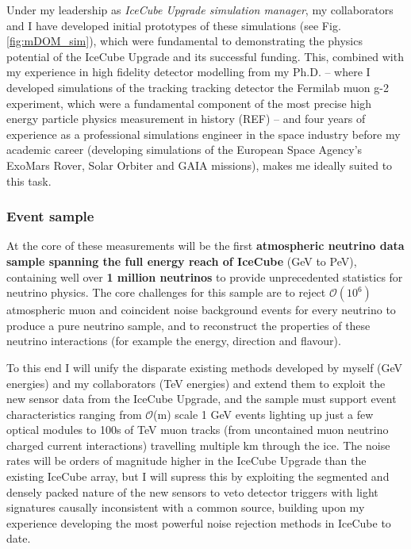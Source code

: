 \documentclass[a4paper,11pt]{article}
\begin{document}
Under my leadership as \textit{IceCube Upgrade simulation manager}, my collaborators and I have developed initial prototypes of these simulations (see Fig. \ref{fig:mDOM_sim}), which were fundamental to demonstrating the physics potential of the IceCube Upgrade and its successful funding. This, combined with my experience in high fidelity detector modelling from my Ph.D. -- where I developed simulations of the tracking tracking detector the Fermilab muon g-2 experiment, which were a fundamental component of the most precise high energy particle physics measurement in history (REF) -- and four years of experience as a professional simulations engineer in the space industry before my academic career (developing simulations of the European Space Agency's ExoMars Rover, Solar Orbiter and GAIA missions), makes me ideally suited to this task. \\



\subsubsection{Event sample}

At the core of these measurements will be the first \textbf{atmospheric neutrino data sample spanning the full energy reach of IceCube} (GeV to PeV), containing well over \textbf{1 million neutrinos} to provide unprecedented statistics for neutrino physics. The core challenges for this sample are to reject $\mathcal{O}(10^6)$ atmospheric muon and coincident noise background events for every neutrino to produce a pure neutrino sample, and to reconstruct the properties of these neutrino interactions (for example the energy, direction and flavour). 

To this end I will unify the disparate existing methods developed by myself (GeV energies) and my collaborators (TeV energies) and extend them to exploit the new sensor data from the IceCube Upgrade, and the sample must support event characteristics ranging from $\mathcal{O}$(m) scale 1 GeV events lighting up just a few optical modules to 100s of TeV muon tracks (from uncontained muon neutrino charged current interactions) travelling multiple km through the ice.  The noise rates will be orders of magnitude higher in the IceCube Upgrade than the existing IceCube array, but I will supress this by exploiting the segmented and densely packed nature of the new sensors to veto detector triggers with light signatures causally inconsistent with a common source, building upon my experience developing the most powerful noise rejection methods in IceCube to date.
\end{document}
